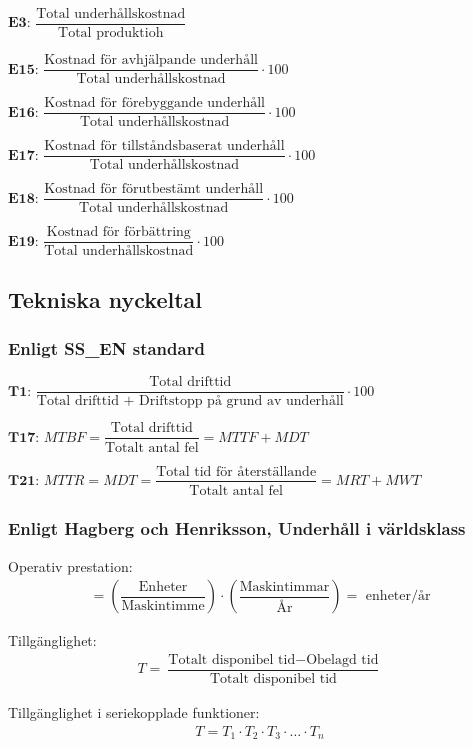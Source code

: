 		$\textbf{E3: } \dfrac{\text{Total underhållskostnad}}{\text{Total produktioh}}$

		$\textbf{E15: } \dfrac{\text{Kostnad för avhjälpande underhåll}}{\text{Total underhållskostnad}} \cdot 100$

		$\textbf{E16: } \dfrac{\text{Kostnad för förebyggande underhåll}}{\text{Total underhållskostnad}} \cdot 100$

		$\textbf{E17: } \dfrac{\text{Kostnad för tillståndsbaserat underhåll}}{\text{Total underhållskostnad}} \cdot 100$

		$\textbf{E18: } \dfrac{\text{Kostnad för förutbestämt underhåll}}{\text{Total underhållskostnad}} \cdot 100$

		$\textbf{E19: } \dfrac{\text{Kostnad för förbättring}}{\text{Total underhållskostnad}} \cdot 100$
\subsection*{Tekniska nyckeltal}
\subsubsection*{Enligt SS\_EN standard}
		$\textbf{T1: } \dfrac{\text{Total drifttid}}{\text{Total drifttid + Driftstopp på grund av underhåll}} \cdot 100$
	
		$\textbf{T17: } MTBF= \dfrac{\text{Total drifttid}}{\text{Totalt antal fel}} = MTTF + MDT$
	
		$\textbf{T21: } MTTR = MDT = \dfrac{\text{Total tid för återställande}}{\text{Totalt antal fel}} = MRT + MWT$
		\subsubsection*{Enligt Hagberg och Henriksson, Underhåll i världsklass}
		
			Operativ prestation: 
      \begin{align*}
        =\left( \dfrac{\text{Enheter}}{\text{Maskintimme}} \right) \cdot \left( \dfrac{\text{Maskintimmar}}{\text{År}} \right)= \text{ enheter/år}
      \end{align*}
			
			Tillgänglighet: 
      \begin{align*}
      T = \dfrac{\text{Totalt disponibel tid} - \text{Obelagd tid}}{\text{Totalt disponibel tid}}
      \end{align*}
			
			Tillgänglighet i seriekopplade funktioner: 
      \begin{align*}
      T = T_1 \cdot T_2 \cdot T_3 \cdot \ldots  \cdot T_n 
      \end{align*}
			
